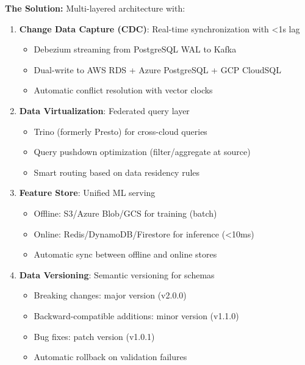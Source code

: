 \textbf{The Solution:} Multi-layered architecture with:

\begin{enumerate}
    \item \textbf{Change Data Capture (CDC)}: Real-time synchronization with <1s lag
    \begin{itemize}
        \item Debezium streaming from PostgreSQL WAL to Kafka
        \item Dual-write to AWS RDS + Azure PostgreSQL + GCP CloudSQL
        \item Automatic conflict resolution with vector clocks
    \end{itemize}

    \item \textbf{Data Virtualization}: Federated query layer
    \begin{itemize}
        \item Trino (formerly Presto) for cross-cloud queries
        \item Query pushdown optimization (filter/aggregate at source)
        \item Smart routing based on data residency rules
    \end{itemize}

    \item \textbf{Feature Store}: Unified ML serving
    \begin{itemize}
        \item Offline: S3/Azure Blob/GCS for training (batch)
        \item Online: Redis/DynamoDB/Firestore for inference (<10ms)
        \item Automatic sync between offline and online stores
    \end{itemize}

    \item \textbf{Data Versioning}: Semantic versioning for schemas
    \begin{itemize}
        \item Breaking changes: major version (v2.0.0)
        \item Backward-compatible additions: minor version (v1.1.0)
        \item Bug fixes: patch version (v1.0.1)
        \item Automatic rollback on validation failures
    \end{itemize}
\end{enumerate}

